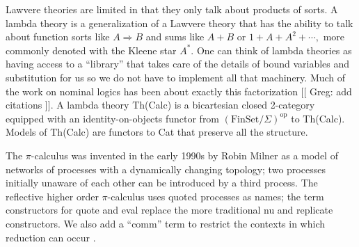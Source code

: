 \documentclass{llncs}
\newcommand{\FinSet}{\mathrm{FinSet}}
\newcommand{\op}{\mathrm{op}}
\begin{document}
Lawvere theories are limited in that they only talk about products of sorts.  A lambda theory is a generalization of a Lawvere theory that has the ability to talk about function sorts like $A \Rightarrow B$ and sums like $A+B$ or $1 + A + A^2 + \cdots,$ more commonly denoted with the Kleene star $A^*.$  One can think of lambda theories as having access to a ``library'' that takes care of the details of bound variables and substitution for us so we do not have to implement all that machinery.  Much of the work on nominal logics has been about exactly this factorization [[ Greg: add citations ]].  A lambda theory Th(Calc) is a bicartesian closed 2-category equipped with an identity-on-objects functor from $(\FinSet/\Sigma)^{\op}$ to Th(Calc).  Models of Th(Calc) are functors to Cat that preserve all the structure.

The $\pi$-calculus was invented in the early 1990s by Robin Milner as a model of networks of processes with a dynamically changing topology; two processes initially unaware of each other can be introduced by a third process.  The reflective higher order $\pi$-calculus uses quoted processes as names; the term constructors for quote and eval replace the more traditional nu and replicate constructors.  We also add a ``comm'' term to restrict the contexts in which reduction can occur \cite{DBLP:journals/corr/StayM15}.
\end{document}
